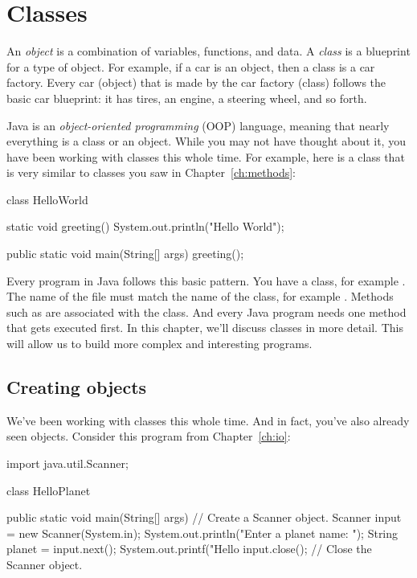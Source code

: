 \chapter{Classes}
\label{ch:classes}

An \emph{object} is a combination of variables, functions, and data. A \emph{class} is a blueprint for a type of object. For example, if a car is an object, then a class is a car factory. Every car (object) that is made by the car factory (class) follows the basic car blueprint: it has tires, an engine, a steering wheel, and so forth.

Java is an \emph{object-oriented programming} (OOP) language, meaning that nearly everything is a class or an object. While you may not have thought about it, you have been working with classes this whole time. For example, here is a class that is very similar to classes you saw in Chapter~\ref{ch:methods}:

\begin{code}
class HelloWorld {

    static void greeting() {
        System.out.println("Hello World");
    } 

    public static void main(String[] args) {
        greeting();
    }
}
\end{code}

Every program in Java follows this basic pattern. You have a class, for example . The name of the file must match the name of the class, for example . Methods such as  are associated with the class. And every Java program needs one  method that gets executed first. In this chapter, we'll discuss classes in more detail. This will allow us to build more complex and interesting programs.

\section{Creating objects}

We've been working with classes this whole time. And in fact, you've also already seen objects. Consider this program from Chapter~\ref{ch:io}:

\begin{code}
import java.util.Scanner;

class HelloPlanet {

    public static void main(String[] args) {
        // Create a Scanner object.
        Scanner input = new Scanner(System.in);
        System.out.println("Enter a planet name: ");
        String planet = input.next();
        System.out.printf("Hello %
        input.close();  // Close the Scanner object.
    }
}
\end{code}

